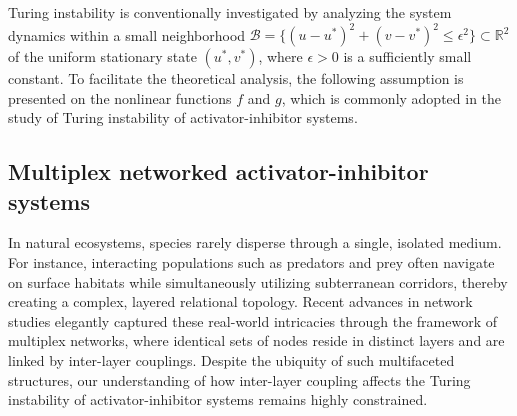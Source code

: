 \documentclass{SCIS2026}
\begin{document}
Turing instability is conventionally investigated by analyzing the system dynamics within a small neighborhood $\mathcal B = \{(u - u^\ast)^2 + (v - v^\ast)^2 \le \epsilon^2\} \subset \mathbb R^2$ of the uniform stationary state $(u^\ast, v^\ast)$, where $\epsilon > 0$ is a sufficiently small constant.
To facilitate the theoretical analysis, the following assumption is presented on the nonlinear functions $f$ and $g$, which is commonly adopted in the study of Turing instability of activator-inhibitor systems.

\label{stationary_state}

\subsection{Multiplex networked activator-inhibitor systems}

In natural ecosystems, species rarely disperse through a single, isolated medium.
For instance, interacting populations such as predators and prey often navigate on surface habitats while simultaneously utilizing subterranean corridors, thereby creating a complex, layered relational topology.
Recent advances in network studies elegantly captured these real-world intricacies through the framework of multiplex networks, where identical sets of nodes reside in distinct layers and are linked by inter-layer couplings.
Despite the ubiquity of such multifaceted structures, our understanding of how inter-layer coupling affects the Turing instability of activator-inhibitor systems remains highly constrained.
\end{document}
